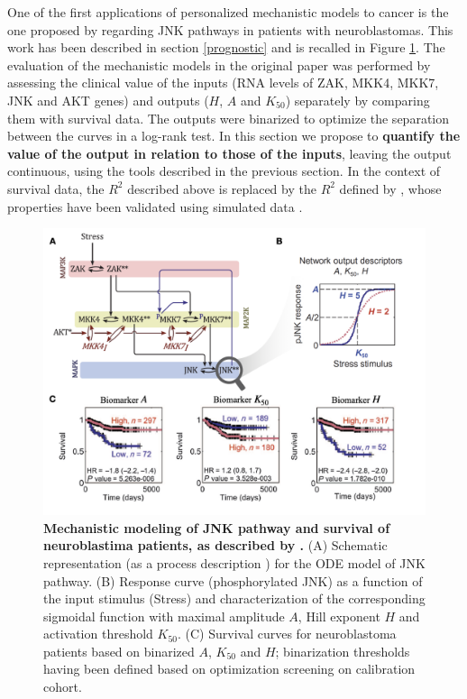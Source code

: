 \documentclass[a4paper,12pt,twoside,onecolumn,openright,final,oldfontcommands]{memoir}
\begin{document}
One of the first applications of personalized mechanistic models to
cancer is the one proposed by \citet{fey2015signaling} regarding JNK
pathways in patients with neuroblastomas. This work has been described
in section \ref{prognostic} and is recalled in Figure \ref{fig:fey2}.
The evaluation of the mechanistic models in the original paper was
performed by assessing the clinical value of the inputs (RNA levels of
ZAK, MKK4, MKK7, JNK and AKT genes) and outputs (\(H\), \(A\) and
\(K_{50}\)) separately by comparing them with survival data. The outputs
were binarized to optimize the separation between the curves in a
log-rank test. In this section we propose to \textbf{quantify the value
of the output in relation to those of the inputs}, leaving the output
continuous, using the tools described in the previous section. In the
context of survival data, the \(R^2\) described above is replaced by the
\(R^2\) defined by \citet{royston2004new}, whose properties have been
validated using simulated data \citep{choodari2012simulation}.

\begin{figure}

{\centering \includegraphics[width=0.9\linewidth]{fig/fey} 

}

\caption[Schematic example of logical and ODE modeling around MAPK signaling]{\textbf{Mechanistic modeling of JNK pathway and
survival of neuroblastima patients, as described by
\citet{fey2015signaling}.} (A) Schematic representation (as a process
description \citep{le2015quantitative}) for the ODE model of JNK
pathway. (B) Response curve (phosphorylated JNK) as a function of the
input stimulus (Stress) and characterization of the corresponding
sigmoidal function with maximal amplitude \(A\), Hill exponent \(H\) and
activation threshold \(K_{50}\). (C) Survival curves for neuroblastoma
patients based on binarized \(A\), \(K_{50}\) and \(H\); binarization
thresholds having been defined based on optimization screening on
calibration cohort.}\label{fig:fey2}
\end{figure}
\end{document}
